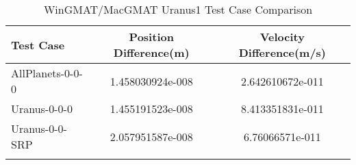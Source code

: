 \begin{table}[htbp!]
\centering
\caption{ WinGMAT/MacGMAT Uranus1 Test Case Comparison}
      \begin{tabular}{lcc}
      \hline\hline
          Test Case & Position Difference(m) & Velocity Difference(m/s) \\
         \hline
         AllPlanets-0-0-0 & 1.458030924e-008 & 2.642610672e-011 \\
         Uranus-0-0-0 & 1.455191523e-008 & 8.413351831e-011 \\
         Uranus-0-0-SRP & 2.057951587e-008 & 6.76066571e-011 \\
      \hline\hline
      \label{Table: Uranus1 WinGMAT-MacGMAT Table} 
\end{tabular}
\end{table}
